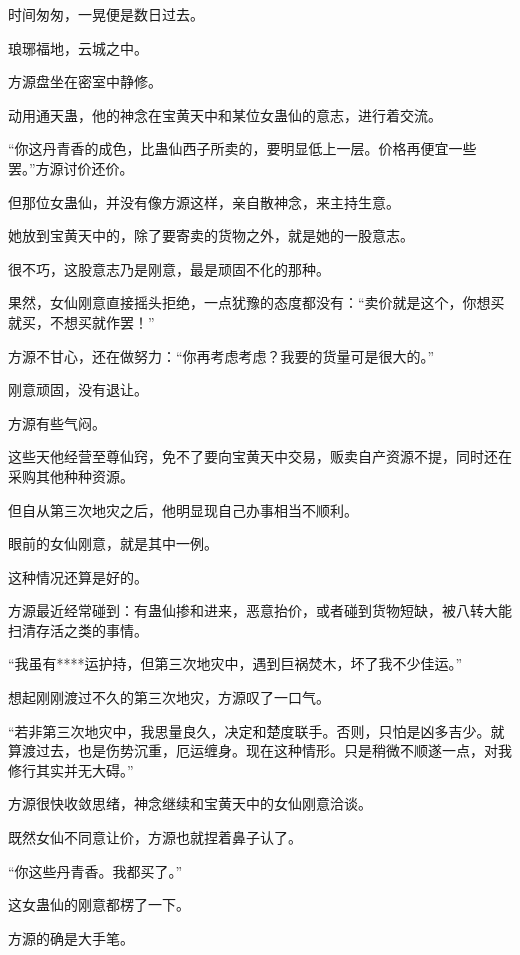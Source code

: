 
\begin{this_body}

时间匆匆，一晃便是数日过去。

琅琊福地，云城之中。

方源盘坐在密室中静修。

动用通天蛊，他的神念在宝黄天中和某位女蛊仙的意志，进行着交流。

“你这丹青香的成色，比蛊仙西子所卖的，要明显低上一层。价格再便宜一些罢。”方源讨价还价。

但那位女蛊仙，并没有像方源这样，亲自散神念，来主持生意。

她放到宝黄天中的，除了要寄卖的货物之外，就是她的一股意志。

很不巧，这股意志乃是刚意，最是顽固不化的那种。

果然，女仙刚意直接摇头拒绝，一点犹豫的态度都没有：“卖价就是这个，你想买就买，不想买就作罢！”

方源不甘心，还在做努力：“你再考虑考虑？我要的货量可是很大的。”

刚意顽固，没有退让。

方源有些气闷。

这些天他经营至尊仙窍，免不了要向宝黄天中交易，贩卖自产资源不提，同时还在采购其他种种资源。

但自从第三次地灾之后，他明显现自己办事相当不顺利。

眼前的女仙刚意，就是其中一例。

这种情况还算是好的。

方源最近经常碰到：有蛊仙掺和进来，恶意抬价，或者碰到货物短缺，被八转大能扫清存活之类的事情。

“我虽有****运护持，但第三次地灾中，遇到巨祸焚木，坏了我不少佳运。”

想起刚刚渡过不久的第三次地灾，方源叹了一口气。

“若非第三次地灾中，我思量良久，决定和楚度联手。否则，只怕是凶多吉少。就算渡过去，也是伤势沉重，厄运缠身。现在这种情形。只是稍微不顺遂一点，对我修行其实并无大碍。”

方源很快收敛思绪，神念继续和宝黄天中的女仙刚意洽谈。

既然女仙不同意让价，方源也就捏着鼻子认了。

“你这些丹青香。我都买了。”

这女蛊仙的刚意都楞了一下。

方源的确是大手笔。


\end{this_body}
